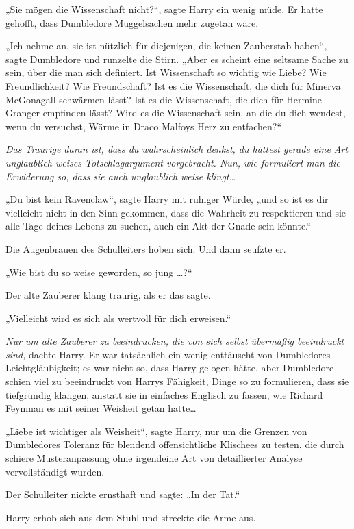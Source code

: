 {„Sie mögen die Wissenschaft nicht?“, sagte Harry ein wenig müde. Er hatte gehofft, dass Dumbledore Muggelsachen mehr zugetan wäre.

„Ich nehme an, sie ist nützlich für diejenigen, die keinen Zauberstab haben“, sagte Dumbledore und runzelte die Stirn. „Aber es scheint eine seltsame Sache zu sein, über die man sich definiert. Ist Wissenschaft so wichtig wie Liebe? Wie Freundlichkeit? Wie Freundschaft? Ist es die Wissenschaft, die dich für Minerva McGonagall schwärmen lässt? Ist es die Wissenschaft, die dich für Hermine Granger empfinden lässt? Wird es die Wissenschaft sein, an die du dich wendest, wenn du versuchst, Wärme in Draco Malfoys Herz zu entfachen?“

\emph{Das Traurige daran ist, dass du wahrscheinlich denkst, du hättest gerade eine Art unglaublich weises Totschlagargument vorgebracht. Nun, wie formuliert man die Erwiderung so, dass sie auch unglaublich weise klingt…}

„Du bist kein Ravenclaw“, sagte Harry mit ruhiger Würde, „und so ist es dir vielleicht nicht in den Sinn gekommen, dass die Wahrheit zu respektieren und sie alle Tage deines Lebens zu suchen, auch ein Akt der Gnade sein könnte.“

Die Augenbrauen des Schulleiters hoben sich. Und dann seufzte er.

„Wie bist du so weise geworden, so jung …?“

Der alte Zauberer klang traurig, als er das sagte.

„Vielleicht wird es sich als wertvoll für dich erweisen.“

\emph{Nur um alte Zauberer zu beeindrucken, die von sich selbst übermäßig beeindruckt sind,} dachte Harry. Er war tatsächlich ein wenig enttäuscht von Dumbledores Leichtgläubigkeit; es war nicht so, dass Harry gelogen hätte, aber Dumbledore schien viel zu beeindruckt von Harrys Fähigkeit, Dinge so zu formulieren, dass sie tiefgründig klangen, anstatt sie in einfaches Englisch zu fassen, wie Richard Feynman es mit seiner Weisheit getan hatte…

„Liebe ist wichtiger als Weisheit“, sagte Harry, nur um die Grenzen von Dumbledores Toleranz für blendend offensichtliche Klischees zu testen, die durch schiere Musteranpassung ohne irgendeine Art von detaillierter Analyse vervollständigt wurden.

Der Schulleiter nickte ernsthaft und sagte: „In der Tat.“

Harry erhob sich aus dem Stuhl und streckte die Arme aus.

}
